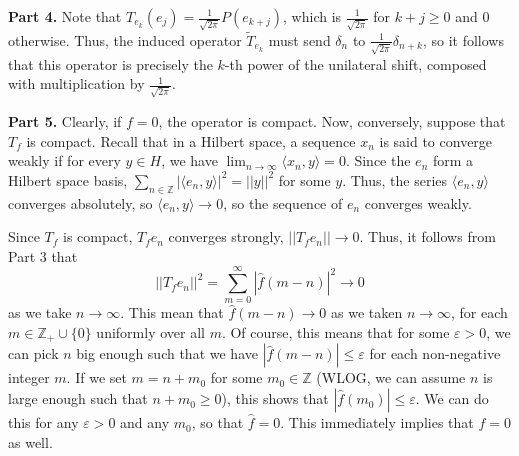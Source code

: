 \documentclass[aps,pra,showpacs,notitlepage,onecolumn,superscriptaddress,nofootinbib]{revtex4-1}
\theoremstyle{definition}
\begin{document}
\noindent \textbf{Part 4.} Note that $T_{e_k}(e_j) = \frac{1}{\sqrt{2\pi}} P(e_{k + j})$, which is $\frac{1}{\sqrt{2\pi}}$ for $k + j \geq 0$ and $0$ otherwise. Thus, the induced operator $\widetilde{T}_{e_k}$ must send $\delta_{n}$ to $\frac{1}{\sqrt{2\pi}} \delta_{n + k}$,
so it follows that this operator is precisely the $k$-th power of the unilateral shift, composed with multiplication by $\frac{1}{\sqrt{2\pi}}$.
\newline

\noindent \textbf{Part 5.} Clearly, if $f = 0$, the operator is compact. Now, conversely, suppose that $T_f$ is compact. Recall that in a Hilbert space, a sequence $x_n$ is said to converge weakly if for every $y \in H$,
we have $\lim_{n \to \infty} \langle x_n, y \rangle = 0$. Since the $e_n$ form a Hilbert space basis, $\sum_{n \in \mathbb{Z}} |\langle e_n, y \rangle|^2 = ||y||^2$ for some $y$. Thus, the series $\langle e_n, y \rangle$
converges absolutely, so $\langle e_n, y \rangle \rightarrow 0$, so the sequence of $e_n$ converges weakly.
\newline

\noindent Since $T_f$ is compact, $T_fe_n$ converges strongly, $||T_f e_n|| \rightarrow 0$. Thus, it follows from Part 3 that
\begin{equation}
  ||T_f e_n ||^2 = \displaystyle\sum_{m = 0}^{\infty} |\hat{f}(m - n)|^2 \rightarrow 0
\end{equation}
as we take $n \to \infty$. This mean that $\hat{f}(m - n) \rightarrow 0$ as we taken $n \to \infty$, for each $m \in \mathbb{Z}_{+} \cup \{0\}$ uniformly over all $m$. Of course, this means
that for some $\varepsilon > 0$, we can pick $n$ big enough such that we have $|\widehat{f}(m - n)| \leq \varepsilon$ for each non-negative integer $m$. If we set $m = n + m_0$ for some $m_0 \in \mathbb{Z}$ (WLOG, we can assume $n$ is large
enough such that $n + m_0 \geq 0$),
this shows that $|\widehat{f}(m_0)| \leq \varepsilon$. We can do this for any $\varepsilon > 0$ and any $m_0$, so that $\widehat{f} = 0$. This immediately implies that $f = 0$ as well.
\newline
\end{document}
